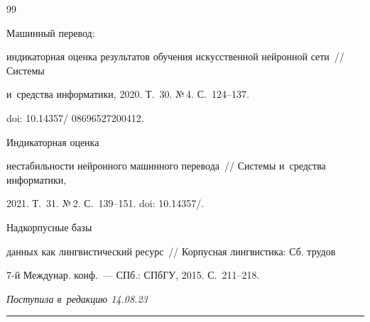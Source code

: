 {{\begin{thebibliography}{99}


 Машинный перевод: 


индикаторная оцен\-ка результатов обуче\-ния искусственной нейронной сети~/\!\!/ Сис\-те\-мы 


и~средства информатики, 2020. Т.~30. №\,4. С.~124--137. 


doi: 10.14357\!/ 08696527200412.







 Индикаторная оцен\-ка 


не\-ста\-биль\-ности нейронного машинного перевода~/\!\!/ Сис\-те\-мы и~средства информатики, 


2021. Т.~31. №\,2. С.~139--151. doi: 10.14357\!/.







 Надкорпусные базы 


данных как линг\-ви\-сти\-че\-ский ресурс~/\!\!/ Корпусная линг\-ви\-сти\-ка: Сб. трудов 


7-й Междунар. конф.~--- СПб.: СПбГУ, 2015. С.~211--218.


 \end{thebibliography}


} }











\vspace*{-6pt}





\hfill{\small\textit{Поступила в~редакцию 14.08.23}}





\vspace*{8pt}





\hrule





\vspace*{2pt}





